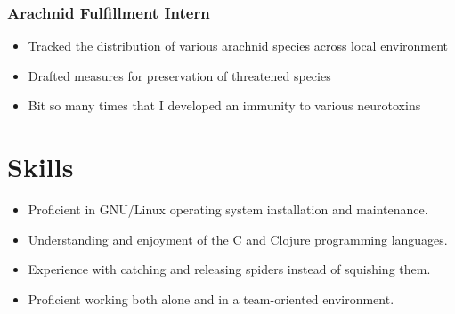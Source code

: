\documentclass[11pt]{article}
\begin{document}
\subsubsection{Arachnid Fulfillment Intern
}
\begin{itemize}
\item Tracked the distribution of various arachnid species across local environment
\item Drafted measures for preservation of threatened species
\item Bit so many times that I developed an immunity to various neurotoxins
\end{itemize}
\section{Skills}
\begin{itemize}
\item Proficient in GNU/Linux operating system installation and maintenance.
\item Understanding and enjoyment of the C and Clojure programming languages.
\item Experience with catching and releasing spiders instead of squishing them.
\item Proficient working both alone and in a team-oriented environment.
\end{itemize}
\end{document}
